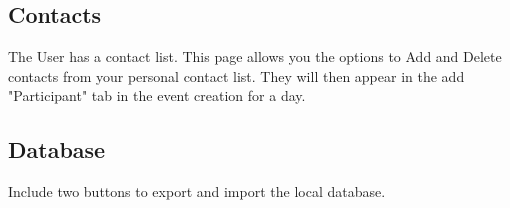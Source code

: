 \subsection{Contacts}
The User has a contact list. This page allows you the options to Add and Delete contacts from your personal contact list. They will then  appear in the add "Participant" tab in the event creation for a day.

\subsection{Database}
Include two buttons to export and import the local database.



